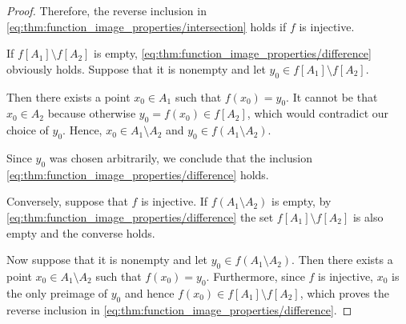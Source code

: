 \begin{proof}
  Therefore, the reverse inclusion in \eqref{eq:thm:function_image_properties/intersection} holds if \( f \) is injective.

   If \( f[A_1] \setminus f[A_2] \) is empty, \eqref{eq:thm:function_image_properties/difference} obviously holds. Suppose that it is nonempty and let \( y_0 \in f[A_1] \setminus f[A_2] \).

  Then there exists a point \( x_0 \in A_1 \) such that \( f(x_0) = y_0 \). It cannot be that \( x_0 \in A_2 \) because otherwise \( y_0 = f(x_0) \in f[A_2] \), which would contradict our choice of \( y_0 \). Hence, \( x_0 \in A_1 \setminus A_2 \) and \( y_0 \in f(A_1 \setminus A_2) \).

  Since \( y_0 \) was chosen arbitrarily, we conclude that the inclusion \eqref{eq:thm:function_image_properties/difference} holds.

  Conversely, suppose that \( f \) is injective. If \( f(A_1 \setminus A_2) \) is empty, by \eqref{eq:thm:function_image_properties/difference} the set \( f[A_1] \setminus f[A_2] \) is also empty and the converse holds.

  Now suppose that it is nonempty and let \( y_0 \in f(A_1 \setminus A_2) \). Then there exists a point \( x_0 \in A_1 \setminus A_2 \) such that \( f(x_0) = y_0 \). Furthermore, since \( f \) is injective, \( x_0 \) is the only preimage of \( y_0 \) and hence \( f(x_0) \in f[A_1] \setminus f[A_2] \), which proves the reverse inclusion in \eqref{eq:thm:function_image_properties/difference}.
\end{proof}

